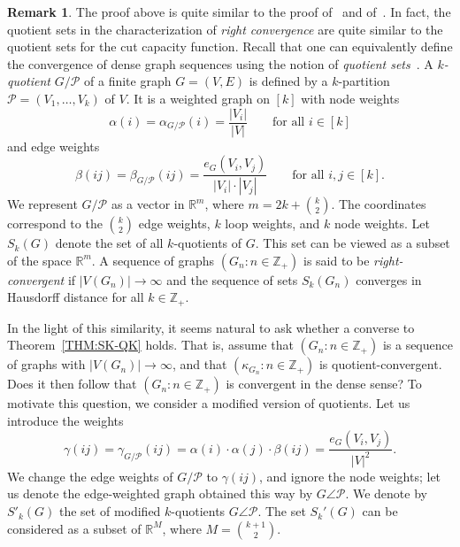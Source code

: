 \documentclass[10pt]{article}
\theoremstyle{plain}
\theoremstyle{definition}
\newtheorem{rem}[thm]{Remark}
\newcommand{\R}{\mathbb{R}}
\newcommand{\PER}{\angle}
\newcommand{\bbZ}{\mathbb{Z}}
\newcommand{\PP}{\mathcal{P}}
\begin{document}
\begin{rem}\label{REM:QUOTIENTS}
The proof above is quite similar to the proof of~\cite[Theorem 2.8]{BCLSV2}
and of~\cite[Lemma 12.3]{lovasz2012large}. In fact, the quotient sets in the
characterization of \emph{right convergence} are quite similar to the quotient sets
for the cut capacity function. Recall that one can equivalently define the convergence of dense graph sequences using the notion of {\it quotient sets}~\cite{BCLSV2}. A {\it $k$-quotient} $G/\PP$ of a finite graph $G=(V,E)$ is defined by a $k$-partition $\PP=(V_1,\dots,V_k)$ of $V$. It is a weighted graph on $[k]$ with node weights
\[
\alpha(i)=\alpha_{G/\PP}(i)=\frac{|V_i|}{|V|} \qquad \text{for all $i\in[k]$}
\]
and edge weights
\[
\beta(ij)=\beta_{G/\PP}(ij)=\frac{e_G(V_i,V_j)}{|V_i|\cdot|V_j|} \qquad \text{for all $i,j\in[k]$}.
\]
We represent $G/\PP$ as a vector in $\mathbb{R}^m$, where $m = 2k + \binom{k}{2}$. The coordinates correspond to the $\binom{k}{2}$ edge weights, $k$ loop weights, and $k$ node weights. Let $S_k(G)$ denote the set of all $k$-quotients of $G$. This set can be viewed as a subset of the space $\mathbb{R}^m$. A sequence of graphs $(G_n \colon n \in \mathbb{Z}_+)$ is said to be {\it right-convergent} if $|V(G_n)| \to \infty$ and the sequence of sets $S_k(G_n)$ converges in Hausdorff distance for all $k\in\bbZ_+$.

In the light of this similarity, it seems natural to ask whether a converse to Theorem~\ref{THM:SK-QK} holds. That is, assume that $(G_n\colon n \in \mathbb{Z}_+)$ is a sequence of graphs with $|V(G_n)| \to \infty$, and that $(\kappa_{G_n} \colon n \in \mathbb{Z}_+)$ is quotient-convergent. Does it then follow that $(G_n \colon n \in \mathbb{Z}_+)$ is convergent in the dense sense? To motivate this question, we consider a modified version of quotients. Let us introduce the weights
\[
\gamma(ij)=\gamma_{G/\PP}(ij)=\alpha(i)\cdot \alpha(j)\cdot \beta(ij)=\frac{e_G(V_i,V_j)}{|V|^2}.
\]
We change the edge weights of $G/\PP$ to $\gamma(ij)$, and ignore the node weights;
let us denote the edge-weighted graph obtained this way by $G \PER\PP$. We denote by
$S'_k(G)$ the set of modified $k$-quotients $G \PER\PP$. The set $S_k'(G)$ can
be considered as a subset of $\R^M$, where $M=\binom{k+1}{2}$.


\end{rem}
\end{document}
